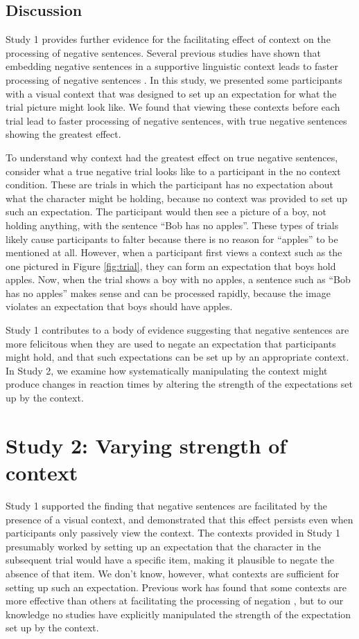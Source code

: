 \documentclass[10pt,letterpaper]{article}
\begin{document}
\subsection{Discussion}

Study 1 provides further evidence for the facilitating effect of context on the processing of negative sentences.  Several previous studies have shown that embedding negative sentences in a supportive linguistic context leads to faster processing of negative sentences \cite{wason1965, glenberg1999, ludtke2006, dale2011}.  In this study, we presented some participants with a visual context that was designed to set up an expectation for what the trial picture might look like.  We found that viewing these contexts before each trial lead to faster processing of negative sentences, with true negative sentences showing the greatest effect.  

To understand why context had the greatest effect on true negative sentences, consider what a true negative trial looks like to a participant in the no context condition.  These are trials in which the participant has no expectation about what the character might be holding, because no context was provided to set up such an expectation.  The participant would then see a picture of a boy, not holding anything, with the sentence ``Bob has no apples''.  These types of trials likely cause participants to falter because there is no reason for ``apples'' to be mentioned at all.  However, when a participant first views a context such as the one pictured in Figure \ref{fig:trial}, they can form an expectation that boys hold apples.  Now, when the trial shows a boy with no apples, a sentence such as ``Bob has no apples'' makes sense and can be processed rapidly, because the image violates an expectation that boys should have apples.  

Study 1 contributes to a body of evidence suggesting that negative sentences are more felicitous when they are used to negate an expectation that participants might hold, and that such expectations can be set up by an appropriate context.  In Study 2, we examine how systematically manipulating the context might produce changes in reaction times by altering the strength of the expectations set up by the context.  

\section{Study 2: Varying strength of context}
Study 1 supported the finding that negative sentences are facilitated by the presence of a visual context, and demonstrated that this effect persists even when participants only passively view the context.  The contexts provided in Study 1 presumably worked by setting up an expectation that the character in the subsequent trial would have a specific item, making it plausible to negate the absence of that item.  We don't know, however, what contexts are sufficient for setting up such an expectation.  Previous work has found that some contexts are more effective than others at facilitating the processing of negation \cite{ludtke2006, dale2011}, but to our knowledge no studies have explicitly manipulated the strength of the expectation set up by the context.  
\end{document}
